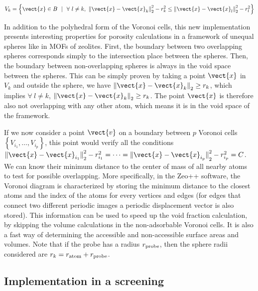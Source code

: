\documentclass[main]{subfiles}
\begin{document}
\begin{equation}\label{eq:r_voronoi_radical}
    V_{k} = \left\{\vect{x} \in B\ \ |\ \ \forall\ l\neq k,\ {\lVert \vect{x}-\vect{x}_k \rVert}_2^2 - r_k^2 \leq {\lVert \vect{x}-\vect{x}_l \rVert}_2^2 - r_l^2 \right\}
  \end{equation}

In addition to the polyhedral form of the Voronoi cells, this new implementation presents interesting properties for porosity calculations in a framework of unequal spheres like in MOFs of zeolites.\autocite{voronoi_radical} First, the boundary between two overlapping spheres corresponds simply to the intersection place between the spheres. Then, the boundary between non-overlapping spheres is always in the void space between the spheres. This can be simply proven by taking a point $\vect{x}$ in $V_{k}$ and outside the sphere, we have ${\lVert \vect{x}-\vect{x}_k \rVert}_2 \geq r_k$, which implies $\forall\ l\neq k$, ${\lVert \vect{x}-\vect{x}_k \rVert}_2 \geq r_k$. The point $\vect{x}$ is therefore also not overlapping with any other atom, which means it is in the void space of the framework. 

If we now consider a point $\vect{v}$ on a boundary between $p$ Voronoi cells $\left\{V_{i_1},\ldots,V_{i_p}\right\}$, this point would verify all the conditions ${\lVert \vect{x}-\vect{x}_{i_1} \rVert}_2^2 - r_{i_1}^2 = \cdots = {\lVert \vect{x}-\vect{x}_{i_p} \rVert}_2^2 - r_{i_p}^2 = C$. We can know their minimum distance to the center of mass of all nearby atoms to test for possible overlapping. More specifically, in the Zeo++ software,\autocite{Zeo++} the Voronoi diagram is characterized by storing the minimum distance to the closest atoms and the index of the atoms for every vertices and edges (for edges that connect two different periodic images a periodic displacement vector is also stored). This information can be used to speed up the void fraction calculation, by skipping the volume calculations in the non-adsorbable Voronoi cells. It is also a fast way of determining the accessible and non-accessible surface areas and volumes.\autocite{Zeo++} Note that if the probe has a radius $r_{\text{probe}}$, then the sphere radii considered are $r_k = r_{\text{atom}}+r_{\text{probe}}$.

\subsection{Implementation in a screening}
\end{document}
